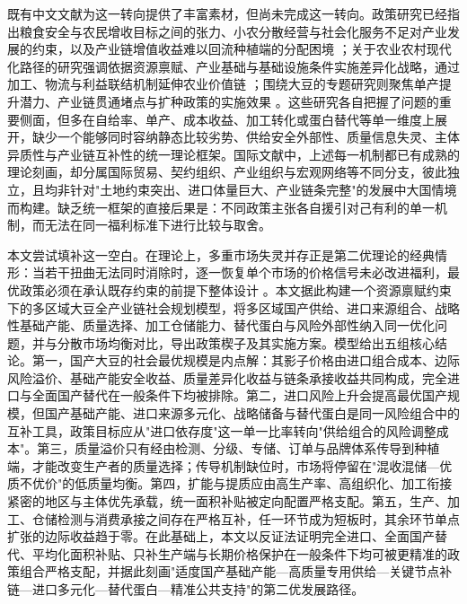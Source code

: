 \documentclass[UTF8,zihao=-4,fontset=fandol]{ctexart}
\numberwithin{equation}{section}
\theoremstyle{definition}
\theoremstyle{remark}
\begin{document}
既有中文文献为这一转向提供了丰富素材，但尚未完成这一转向。政策研究已经指出粮食安全与农民增收目标之间的张力、小农分散经营与社会化服务不足对产业发展的约束，以及产业链增值收益难以回流种植端的分配困境 \parencite{CASSRDI2024}；关于农业农村现代化路径的研究强调依据资源禀赋、产业基础与基础设施条件实施差异化战略，通过加工、物流与利益联结机制延伸农业价值链 \parencite{DRCRural2023}；围绕大豆的专题研究则聚焦单产提升潜力、产业链贯通堵点与扩种政策的实施效果 \parencite{CAASSoy2026,CAAS2006002026}。这些研究各自把握了问题的重要侧面，但多在自给率、单产、成本收益、加工转化或蛋白替代等单一维度上展开，缺少一个能够同时容纳静态比较劣势、供给安全外部性、质量信息失灵、主体异质性与产业链互补性的统一理论框架。国际文献中，上述每一机制都已有成熟的理论刻画，却分属国际贸易、契约组织、产业组织与宏观网络等不同分支，彼此独立，且均非针对"土地约束突出、进口体量巨大、产业链条完整"的发展中大国情境而构建。缺乏统一框架的直接后果是：不同政策主张各自援引对己有利的单一机制，而无法在同一福利标准下进行比较与取舍。

本文尝试填补这一空白。在理论上，多重市场失灵并存正是第二优理论的经典情形：当若干扭曲无法同时消除时，逐一恢复单个市场的价格信号未必改进福利，最优政策必须在承认既存约束的前提下整体设计 \parencite{LipseyLancaster1956}。本文据此构建一个资源禀赋约束下的多区域大豆全产业链社会规划模型，将多区域国产供给、进口来源组合、战略性基础产能、质量选择、加工仓储能力、替代蛋白与风险外部性纳入同一优化问题，并与分散市场均衡对比，导出政策楔子及其实施方案。模型给出五组核心结论。第一，国产大豆的社会最优规模是内点解：其影子价格由进口组合成本、边际风险溢价、基础产能安全收益、质量差异化收益与链条承接收益共同构成，完全进口与全面国产替代在一般条件下均被排除。第二，进口风险上升会提高最优国产规模，但国产基础产能、进口来源多元化、战略储备与替代蛋白是同一风险组合中的互补工具，政策目标应从"进口依存度"这一单一比率转向"供给组合的风险调整成本"。第三，质量溢价只有经由检测、分级、专储、订单与品牌体系传导到种植端，才能改变生产者的质量选择；传导机制缺位时，市场将停留在"混收混储—优质不优价"的低质量均衡。第四，扩能与提质应由高生产率、高组织化、加工衔接紧密的地区与主体优先承载，统一面积补贴被定向配置严格支配。第五，生产、加工、仓储检测与消费承接之间存在严格互补，任一环节成为短板时，其余环节单点扩张的边际收益趋于零。在此基础上，本文以反证法证明完全进口、全面国产替代、平均化面积补贴、只补生产端与长期价格保护在一般条件下均可被更精准的政策组合严格支配，并据此刻画"适度国产基础产能—高质量专用供给—关键节点补链—进口多元化—替代蛋白—精准公共支持"的第二优发展路径。
\end{document}
